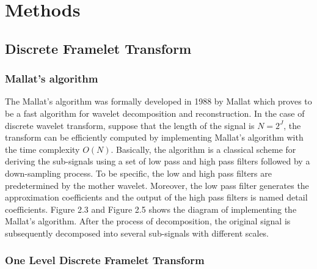
\chapter{Methods} %

\label{Chapter2} %



\section{Discrete Framelet Transform}



\subsection{Mallat's algorithm}
The Mallat's algorithm was formally developed in 1988 by Mallat which proves to be a fast algorithm for wavelet decomposition and reconstruction. In the case of discrete wavelet transform, suppose that the length of the signal is $N = 2^J$, the transform can be efficiently computed by implementing Mallat's algorithm with the time complexity $O(N)$. Basically, the algorithm is a classical scheme for deriving the sub-signals using a set of low pass and high pass filters followed by a down-sampling process. To be specific, the low and high pass filters are predetermined by the mother wavelet. Moreover, the low pass filter generates the approximation coefficients and the output of the high pass filters is named detail coefficients. Figure 2.3 and Figure 2.5 shows the diagram of implementing the Mallat's algorithm. After the process of decomposition, the original signal is subsequently decomposed into several sub-signals with different scales.


\subsection{One Level Discrete Framelet Transform}

